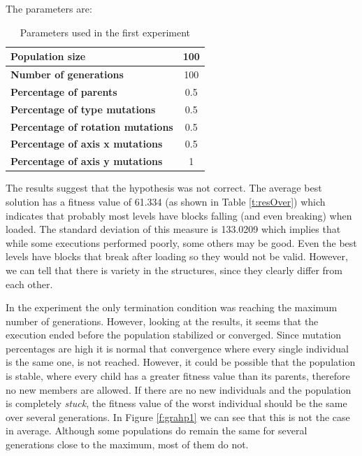 \documentclass[runningheads,a4paper]{llncs}
\newcommand{\myfloatalign}{\centering} %
\begin{document}
The parameters are: %

\begin{table}[H]
	\myfloatalign
	\begin{tabular}{lc}
		\hline
		\textbf{Population size} & 100 \\ \hline
		\textbf{Number of generations} & 100 \\  \hline
		\textbf{Percentage of parents} &  0.5 \\  \hline
		\textbf{Percentage of type mutations} & 0.5 \\  \hline
		\textbf{Percentage of rotation mutations} & 0.5 \\  \hline
		\textbf{Percentage of axis x mutations}  & 0.5 \\  \hline
		\textbf{Percentage of axis y mutations}  & 1 \\  \hline
	\end{tabular}
	\caption{Parameters used in the first experiment} 
	\label{t:base}
\end{table}

The results suggest that the hypothesis was not correct. The average best 
solution has a fitness value of 61.334 (as shown in Table \ref{t:resOver}) 
which indicates that probably most levels have blocks falling (and even 
breaking) when loaded. The standard deviation of this measure is 133.0209 which 
implies that while some executions performed poorly, some others may be good. 
Even the best levels have blocks that break after loading so they would not be 
valid. However, we can tell that there is variety in the structures, since they 
clearly differ from each other. 

In the experiment the only termination condition was reaching the maximum 
number of generations. However, looking at the results, it seems that the 
execution ended before the population stabilized or converged. Since mutation 
percentages are high it is normal that convergence where every single 
individual is the same one, is not reached. However, it could be possible that 
the population is stable, where every child has a greater fitness value than 
its parents, therefore no new members are allowed. If there are no new 
individuals and the population is completely \textit{stuck}, the fitness value 
of the worst individual should be the same over several generations. In Figure 
\ref{f:grahp1} we can see that this is not the case in average. Although some 
populations do remain the same for several generations close to the maximum, 
most of them do not.
\end{document}

